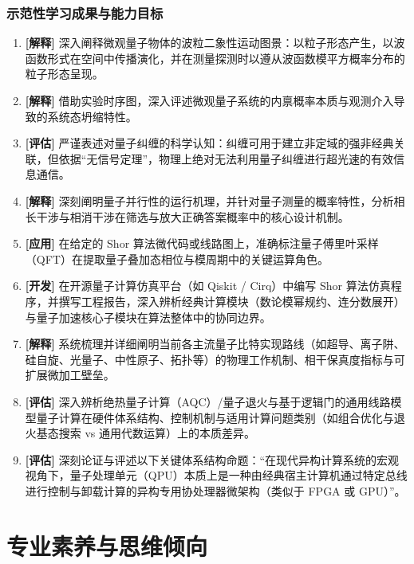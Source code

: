 \subsubsection{示范性学习成果与能力目标}
\begin{enumerate}
    \item \textbf{[解释]} 深入阐释微观量子物体的波粒二象性运动图景：以粒子形态产生，以波函数形式在空间中传播演化，并在测量探测时以遵从波函数模平方概率分布的粒子形态呈现。
    \item \textbf{[解释]} 借助实验时序图，深入评述微观量子系统的内禀概率本质与观测介入导致的系统态坍缩特性。
    \item \textbf{[评估]} 严谨表述对量子纠缠的科学认知：纠缠可用于建立非定域的强非经典关联，但依据“无信号定理”，物理上绝对无法利用量子纠缠进行超光速的有效信息通信。
    \item \textbf{[解释]} 深刻阐明量子并行性的运行机理，并针对量子测量的概率特性，分析相长干涉与相消干涉在筛选与放大正确答案概率中的核心设计机制。
    \item \textbf{[应用]} 在给定的 Shor 算法微代码或线路图上，准确标注量子傅里叶采样（QFT）在提取量子叠加态相位与模周期中的关键运算角色。
    \item \textbf{[开发]} 在开源量子计算仿真平台（如 Qiskit / Cirq）中编写 Shor 算法仿真程序，并撰写工程报告，深入辨析经典计算模块（数论模幂规约、连分数展开）与量子加速核心子模块在算法整体中的协同边界。
    \item \textbf{[解释]} 系统梳理并详细阐明当前各主流量子比特实现路线（如超导、离子阱、硅自旋、光量子、中性原子、拓扑等）的物理工作机制、相干保真度指标与可扩展微加工壁垒。
    \item \textbf{[评估]} 深入辨析绝热量子计算（AQC）/量子退火与基于逻辑门的通用线路模型量子计算在硬件体系结构、控制机制与适用计算问题类别（如组合优化与退火基态搜索 vs 通用代数运算）上的本质差异。
    \item \textbf{[评估]} 深刻论证与评述以下关键体系结构命题：“在现代异构计算系统的宏观视角下，量子处理单元（QPU）本质上是一种由经典宿主计算机通过特定总线进行控制与卸载计算的异构专用协处理器微架构（类似于 FPGA 或 GPU）”。
\end{enumerate}

\section{专业素养与思维倾向}

